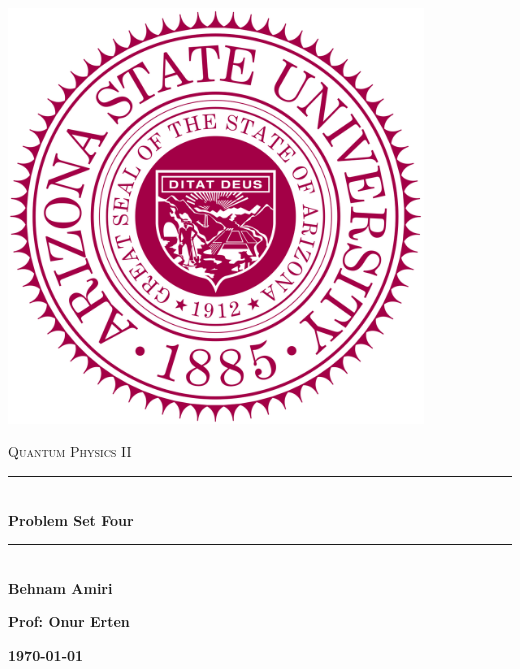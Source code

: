 \documentclass[fleqn]{article}
\begin{document}
  \begin{titlepage}

    \newcommand{\HRule}{\rule{\linewidth}{0.5mm}}

    \center

    \begin{center}
      \includegraphics[height=11cm, width=11cm]{asu.png}
    \end{center}

    \vline

    \textsc{\LARGE Quantum Physics II}\\[1.5cm]

    \HRule \\[0.5cm]
    { \huge \bfseries Problem Set Four}\\[0.4cm] 
    \HRule \\[1.0cm]

    \textbf{Behnam Amiri}

    \bigbreak

    \textbf{Prof: Onur Erten}

    \bigbreak

    \textbf{{\large \today}\\[2cm]}

    \vfill

  \end{titlepage}
\end{document}
